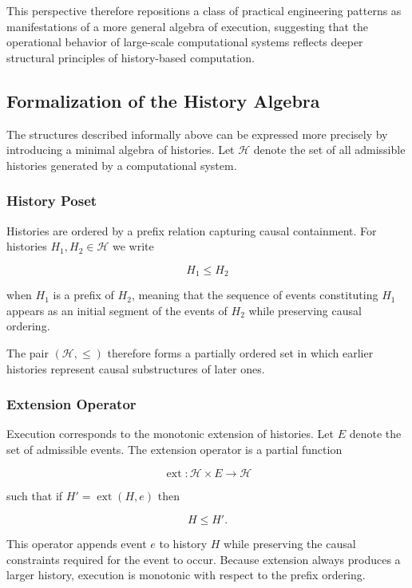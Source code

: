 \documentclass[12pt]{article}
\begin{document}
This perspective therefore repositions a class of
practical engineering patterns as manifestations of
a more general algebra of execution, suggesting that
the operational behavior of large-scale computational
systems reflects deeper structural principles of
history-based computation.


\subsection{Formalization of the History Algebra}

The structures described informally above can be expressed
more precisely by introducing a minimal algebra of histories.
Let $\mathcal{H}$ denote the set of all admissible histories
generated by a computational system.

\subsubsection{History Poset}

Histories are ordered by a prefix relation capturing causal
containment. For histories $H_1, H_2 \in \mathcal{H}$ we write

\[
H_1 \leq H_2
\]

when $H_1$ is a prefix of $H_2$, meaning that the sequence
of events constituting $H_1$ appears as an initial segment
of the events of $H_2$ while preserving causal ordering.

The pair $(\mathcal{H}, \leq)$ therefore forms a partially
ordered set in which earlier histories represent causal
substructures of later ones.

\subsubsection{Extension Operator}

Execution corresponds to the monotonic extension of histories.
Let $E$ denote the set of admissible events. The extension
operator is a partial function

\[
\operatorname{ext} : \mathcal{H} \times E \rightarrow \mathcal{H}
\]

such that if $H' = \operatorname{ext}(H, e)$ then

\[
H \leq H'.
\]

This operator appends event $e$ to history $H$ while
preserving the causal constraints required for the event
to occur. Because extension always produces a larger
history, execution is monotonic with respect to the
prefix ordering.
\end{document}
